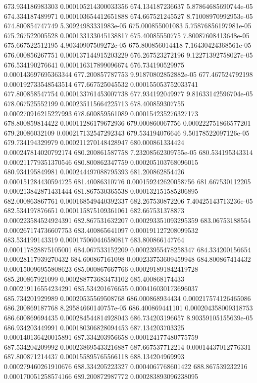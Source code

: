 {673.934186983303 0.000105214300033356
674.134187236637 5.87864685690744e-05
674.334187489971 0.000103654412651888
674.667521245527 8.71008970992953e-05
674.800854747749 5.30924983331983e-05
675.000855001083 5.75876856197981e-05
675.267522005528 0.000133133045138817
675.40085550775 7.80087608413648e-05
675.667522512195 4.90340907509272e-05
675.800856014418 7.16430424368561e-05
676.000856267751 0.000137144915203229
676.267523272196 9.12271392758027e-05
676.534190276641 0.000116317899096674
676.734190529975 0.000143697695363344
677.200857787753 9.91870802852882e-05
677.467524792198 0.000192733548543514
677.667525045532 0.000155053752033741
677.800858547754 0.000133761453007738
677.934192049977 9.81633142596704e-05
678.067525552199 0.000235115664225713
678.400859307755 0.000270916215227993
678.600859561089 0.000154235276327173
678.800859814422 0.00011286179672936
679.000860067756 0.000222751866577201
679.20086032109 0.000217132547292343
679.534194076646 9.50178522097126e-05
679.734194329979 0.000211270148428947
680.000861334424 0.000247814020792174
680.200861587758 7.23208562309755e-05
680.534195343314 0.000211779351370546
680.800862347759 0.000205103768096015
680.934195849981 0.000244497088795393
681.200862854426 0.000151284430594725
681.40086310776 0.000159242620058756
681.667530112205 0.000213842871431444
681.867530365538 0.000132151585206895
682.000863867761 0.000168549440392337
682.267530872206 7.40425143713236e-05
682.534197876651 0.000115875109361061
682.667531378873 0.000223584524924391
682.867531632207 0.000293351093295359
683.06753188554 0.000267174736607753
683.400865641097 0.000191127208099532
683.534199143319 0.000175060446580817
683.800866147764 0.000117828875105001
684.067533152209 0.00023955478258347
684.334200156654 0.00028117939270432
684.600867161098 0.000233753609459948
684.800867414432 0.000150096955808623
685.000867667766 0.000291891842419728
685.200867921099 0.000288773683473102
685.400868174433 0.000219116554234291
685.534201676655 0.000416030173696037
685.734201929989 0.00020535569508768
686.000868934434 0.000217574126465086
686.200869187768 8.29584660140757e-05
686.400869441101 0.000204358009318753
686.600869694435 0.000284544814928043
686.734203196657 8.90359105155639e-05
686.934203449991 0.000180306828094453
687.134203703325 0.000140136420015891
687.334203956658 0.000124177480775759
687.534204209992 0.000238695433216887
687.667537712214 0.00014437012776331
687.800871214437 0.000155895765566118
688.134204969993 0.000279460261910676
688.334205223327 0.0004067768601422
688.867539232216 0.000170051258574166
689.200872987772 0.000283893096238095
}
